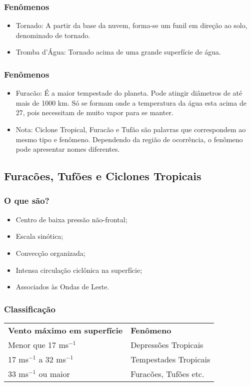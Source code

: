 \begin{frame}
\frametitle{Fenômenos}
\begin{itemize}[<+-| alert@+>]
  \item Tornado: A partir da base da nuvem, forma-se um funil em direção ao
        solo, denominado de tornado.
  \item Tromba d'Água: Tornado acima de uma grande superfície de água.
\end{itemize}
\end{frame}

\begin{frame}
\frametitle{Fenômenos}
\begin{itemize}[<+-| alert@+>]
  \item Furacão: É a maior tempestade do planeta.  Pode atingir diâmetros de até
        mais de 1000 km. Só se formam onde a temperatura da água esta acima de
        27\textcelsius{}, pois necessitam de muito vapor para se manter.
  \item Nota: Ciclone Tropical, Furacão e Tufão são palavras que correspondem ao
        mesmo tipo e fenômeno. Dependendo da região de ocorrência, o fenômeno
        pode apresentar nomes diferentes.
\end{itemize}
\end{frame}


\subsection{Furacões, Tufões e Ciclones Tropicais}
\begin{frame}
\frametitle{O que são?}
\begin{itemize}[<+-| alert@+>]
  \item Centro de baixa pressão não-frontal;
  \item Escala sinótica;
  \item Convecção organizada;
  \item Intensa circulação ciclônica na superfície;
  \item Associados às Ondas de Leste.
\end{itemize}
\end{frame}


\begin{frame}
\frametitle{Classificação}
\begin{table}[h]
  \begin{tabular}{l|l}
  \hline\hline
  {\bf Vento máximo em superfície}       & {\bf Fenômeno}        \\
  Menor que 17 ms$^{-1}$                 & Depressões Tropicais  \\
  17 ms$^{-1}$ a 32 ms$^{-1}$            & Tempestades Tropicais \\
  33 ms$^{-1}$ ou maior                  & Furacões, Tufões etc. \\
  \hline
  \end{tabular}
\end{table}
\end{frame}

